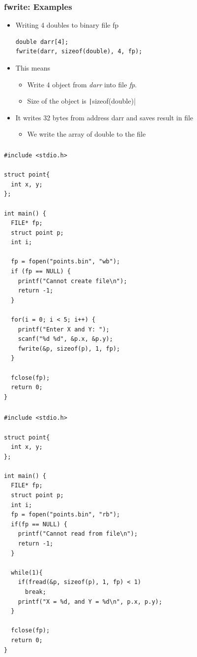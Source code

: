 \documentclass{../c-lecture}
\begin{document}
\begin{frame}[fragile]
  \frametitle{fwrite: Examples}
  \begin{itemize}
    \item Writing 4 doubles to binary file fp
    \begin{verbatim}
double darr[4];
fwrite(darr, sizeof(double), 4, fp);
    \end{verbatim}
    \item This means
    \begin{itemize}
      \item
        Write \textcolor{YellowOrange}{4} object from
        \textit{\color{LimeGreen} darr} into file
        \textit{\color{Violet} fp}.
      \item
        Size of the object is \texttt|sizeof(double)|
    \end{itemize}
    \item It writes 32 bytes from address darr and saves result in file
    \begin{itemize}
      \item We write the array of double to the file
    \end{itemize}
  \end{itemize}
\end{frame}

\begin{frame}[fragile]
  \frametitle{}
  \scriptsize
  \begin{verbatim}
#include <stdio.h>

struct point{
  int x, y;
};

int main() {
  FILE* fp;
  struct point p;
  int i;

  fp = fopen("points.bin", "wb");
  if (fp == NULL) {
    printf("Cannot create file\n");
    return -1;
  }

  for(i = 0; i < 5; i++) {
    printf("Enter X and Y: ");
    scanf("%d %d", &p.x, &p.y);
    fwrite(&p, sizeof(p), 1, fp);
  }

  fclose(fp);
  return 0;
}
  \end{verbatim}
\end{frame}

\begin{frame}[fragile]
  \frametitle{}
  \scriptsize
  \begin{verbatim}
#include <stdio.h>

struct point{
  int x, y;
};

int main() {
  FILE* fp;
  struct point p;
  int i;
  fp = fopen("points.bin", "rb");
  if(fp == NULL) {
    printf("Cannot read from file\n");
    return -1;
  }

  while(1){
    if(fread(&p, sizeof(p), 1, fp) < 1)
      break;
    printf("X = %d, and Y = %d\n", p.x, p.y);
  }

  fclose(fp);
  return 0;
}
  \end{verbatim}
\end{frame}
\end{document}
